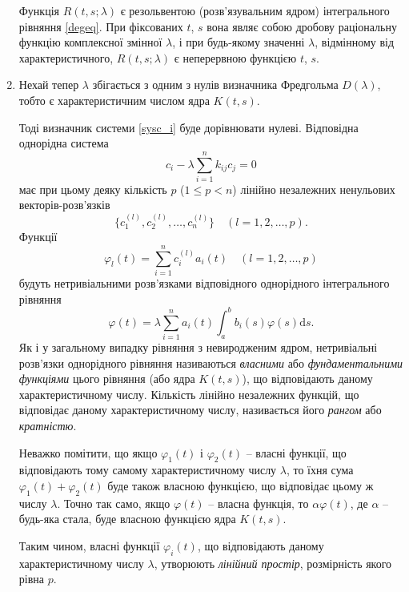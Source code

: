 \documentclass[14pt,twoside]{extreport}
\theoremstyle{mystyle}
\numberwithin{equation}{chapter}
\begin{document}
\begin{enumerate}
Функція $R(t, s; \lambda)$ є резольвентою (розв'язувальним ядром) інтегрального рівняння \eqref{degeq}. При фіксованих $t$, $s$ вона являє собою дробову раціональну функцію комплексної змінної $\lambda$, і при будь-якому значенні $\lambda$, відмінному від характеристичного, $R(t, s; \lambda)$ є неперервною функцією $t$, $s$.

\item Нехай тепер $\lambda$ збігається з одним з нулів визначника Фредгольма $D(\lambda)$, тобто є характеристичним числом ядра $K(t, s)$.

Тоді визначник системи \eqref{sysc_i} буде дорівнювати нулеві. Відповідна однорідна система
\begin{equation}\label{unic_i}
 c_{i}-\displaystyle \lambda\sum_{i=1}^{n}k_{ij}c_{j}=0
\end{equation}
має при цьому деяку кількість $p$ ($1 \leqslant p < n$) лінійно незалежних ненульових векторів-розв'язків
\[
 \{c_{1}^{(l)}, c_{2}^{(l)}, \ldots, c_{n}^{(l)}\} \quad (l=1, 2, \ldots, p).
\]
Функції
\begin{equation}
 \displaystyle \varphi_{l}(t)=\sum_{i=1}^{n}c_{i}^{(l)}a_{i}(t) \quad (l=1, 2, \ldots, p)
\end{equation}
будуть нетривіальними розв'язками відповідного однорідного інтегрального рівняння
\begin{equation}\label{unideg}
\displaystyle \varphi(t)=\lambda\sum_{i=1}^{n} a_{i}(t)\int_{a}^{b} b_{i}(s)\varphi(s)\mathrm{d}s.
\end{equation}
Як і у загальному випадку рівняння з невиродженим ядром, нетривіальні розв'язки однорідного рівняння називаються \emph{власними} або \emph{фундаментальними функціями} цього рівняння (або ядра $K(t, s)$), що відповідають даному характеристичному числу. Кількість лінійно незалежних функцій, що відповідає даному характеристичному числу, називається його \emph{рангом} або \emph{кратністю}.

Неважко помітити, що якщо $\varphi_1(t)$ і $\varphi_2(t)$ -- власні функції, що відповідають тому самому характеристичному числу $\lambda$, то їхня сума $\varphi_1(t) + \varphi_2(t)$ буде також власною функцією, що відповідає цьому ж числу $\lambda$. Точно так само, якщо $\varphi(t)$ -- власна функція, то $\alpha\varphi(t)$, де $\alpha$ -- будь-яка стала, буде власною функцією ядра $K(t, s)$.

Таким чином, власні функції $\varphi_i(t)$, що відповідають даному характеристичному числу $\lambda$, утворюють \emph{лінійний простір}, розмірність якого рівна $p$.


\end{enumerate}
\end{document}
